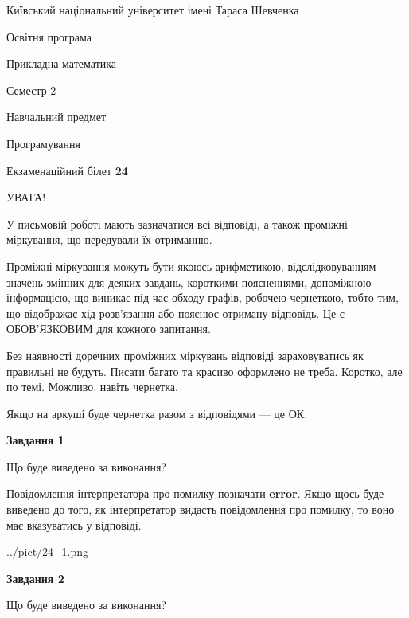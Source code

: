 \documentclass[12pt, ukrainian]{article}
\begin{document}
{{\begin {small}\par
{ \center  Київський національний університет імені Тараса Шевченка \par}
{\parbox {5 cm}{Освітня програма \hfill}{\parbox {7 cm}{Прикладна математика \hfill}}\parbox {6 cm}{\hfill Семестр 2}}\par
{\parbox {5 cm} {Навчальний предмет \hfill}\parbox {7 cm}{Програмування \hfill}\parbox {6cm}{\hfill}\par}\vspace{-7pt} \end{small}}{\center Екзаменаційний білет \No \textbf
{ 24 }\par}}
{
\begin {large}
УВАГА!

У письмовій роботі мають зазначатися всі відповіді, а також проміжні міркування, що передували їх отриманню.

Проміжні міркування можуть бути якоюсь арифметикою, відслідковуванням зна\-чень змінних для деяких завдань,
короткими поясненнями, допоміжною інформацією, що виникає під час обходу графів, робочею чернеткою,
тобто тим, що відображає хід розв’язання або пояснює отриману відповідь.
Це є ОБОВ’ЯЗКОВИМ для кожного запитання.

Без наявності доречних проміжних міркувань відповіді зараховуватись як правиль\-ні не будуть.
Писати багато та красиво оформлено не треба. Коротко, але по темі. Можли\-во, навіть чернетка.

Якщо на аркуші буде чернетка разом з відповідями --- це ОК.

\newpage

{\begin {center}\textbf{Завдання 1}\end {center}}\par
Що буде виведено за виконання?

Повідомлення інтерпретатора про помилку позначати \textbf{error}.
Якщо щось буде виведено до того, як інтерпретатор видасть повідомлення про помилку, 
то воно має вказуватись у відповіді. \par


\begin{center}
	{../pict/24_1.png}
\end{center}
\newpage

{\begin {center}\textbf{Завдання 2}\end {center}}\par
Що буде виведено за виконання?


\end{large}}
\end{document}
